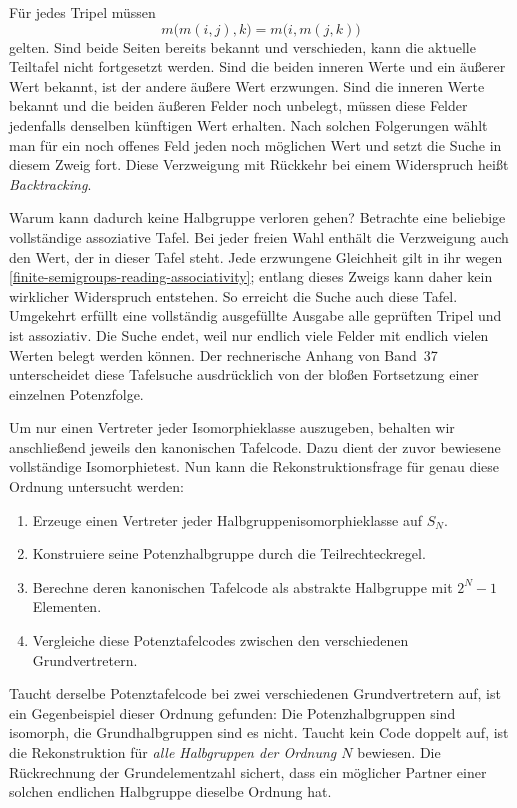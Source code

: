 Für jedes Tripel müssen
\[
  m\bigl(m(i,j),k\bigr)=m\bigl(i,m(j,k)\bigr)
  \tag{A}\label{finite-semigroups-reading-associativity}
\]
gelten. Sind beide Seiten bereits bekannt und verschieden, kann
die aktuelle Teiltafel nicht fortgesetzt werden. Sind die beiden
inneren Werte und ein äußerer Wert bekannt, ist der andere äußere
Wert erzwungen. Sind die inneren Werte bekannt und die beiden
äußeren Felder noch unbelegt, müssen diese Felder jedenfalls
denselben künftigen Wert erhalten. Nach solchen Folgerungen wählt
man für ein noch offenes Feld jeden noch möglichen Wert und
setzt die Suche in diesem Zweig fort. Diese Verzweigung mit
Rückkehr bei einem Widerspruch heißt \emph{Backtracking}.

Warum kann dadurch keine Halbgruppe verloren gehen? Betrachte eine
beliebige vollständige assoziative Tafel. Bei jeder freien Wahl
enthält die Verzweigung auch den Wert, der in dieser Tafel steht.
Jede erzwungene Gleichheit gilt in ihr wegen
\eqref{finite-semigroups-reading-associativity}; entlang dieses Zweigs
kann daher kein wirklicher Widerspruch entstehen. So erreicht die
Suche auch diese Tafel. Umgekehrt erfüllt eine vollständig
ausgefüllte Ausgabe alle geprüften Tripel und ist assoziativ.
Die Suche endet, weil nur endlich viele Felder mit endlich vielen
Werten belegt werden können. Der rechnerische Anhang von Band~37
unterscheidet diese Tafelsuche ausdrücklich von der bloßen
Fortsetzung einer einzelnen Potenzfolge.

Um nur einen Vertreter jeder Isomorphieklasse auszugeben, behalten
wir anschließend jeweils den kanonischen Tafelcode. Dazu dient
der zuvor bewiesene vollständige Isomorphietest. Nun kann die
Rekonstruktionsfrage für genau diese Ordnung untersucht werden:

\begin{enumerate}
  \item Erzeuge einen Vertreter jeder Halbgruppenisomorphieklasse
    auf \(S_N\).
  \item Konstruiere seine Potenzhalbgruppe durch die Teilrechteckregel.
  \item Berechne deren kanonischen Tafelcode als abstrakte Halbgruppe
    mit \(2^N-1\) Elementen.
  \item Vergleiche diese Potenztafelcodes zwischen den verschiedenen
    Grundvertretern.
\end{enumerate}

Taucht derselbe Potenztafelcode bei zwei verschiedenen
Grundvertretern auf, ist ein Gegenbeispiel dieser Ordnung gefunden:
Die Potenzhalbgruppen sind isomorph, die Grundhalbgruppen sind es
nicht. Taucht kein Code doppelt auf, ist die Rekonstruktion für
\emph{alle Halbgruppen der Ordnung \(N\)} bewiesen.
Die Rückrechnung der Grundelementzahl sichert, dass ein möglicher
Partner einer solchen endlichen Halbgruppe dieselbe Ordnung hat.

